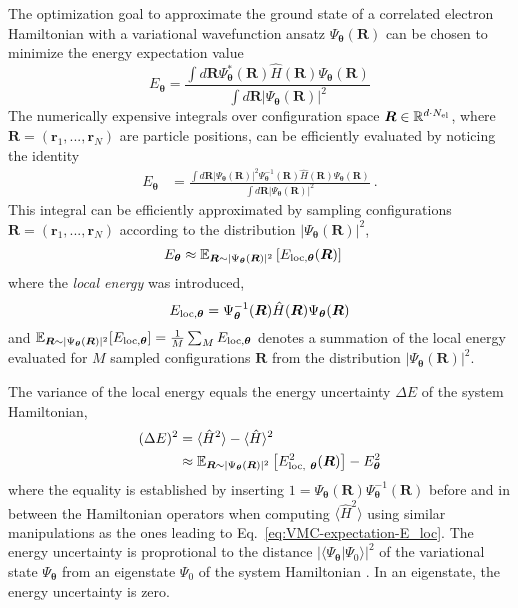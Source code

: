 \documentclass[
 reprint,
 amsmath,amssymb,
 aps, prx,
floatfix,longbibliography,
]{revtex4-2}
\begin{document}
The optimization goal to approximate the ground state of a correlated electron Hamiltonian with a variational wavefunction ansatz $\Psi_{\bm \theta}(\bm R)$ can be chosen to minimize the energy expectation value 
\begin{equation}
    E_{\bm \theta} = \frac{\int d\bm R \Psi_{\bm \theta}^*(\bm R) \hat{H} (\bm R)\Psi_{\bm \theta}(\bm R)}{\int d\bm R |\Psi_{\bm \theta}(\bm R)|^2} 
\end{equation}
The numerically expensive integrals over configuration space $\bm R \in \mathbb{R}^{d\cdot N_{\rm el}}$, where $\bm R = (\bm r_1, ..., \bm r_N)$ are particle positions, can be efficiently evaluated by noticing the identity
\begin{align}
    E_{\bm \theta} & = \frac{\int d\bm R |\Psi_{\bm \theta}(\bm R)|^2 \Psi_{\bm \theta}^{-1}(\bm R) \hat{H} (\bm R)\Psi_{\bm \theta}(\bm R)}{\int d\bm R |\Psi_{\bm \theta}(\bm R)|^2}\ . 
\end{align}
This integral can be efficiently approximated by sampling configurations $\bm R = (\bm r_1, ..., \bm r_N)$ according to the distribution $|\Psi_{\bm \theta}(\bm R)|^2$,
\begin{align}
    E_{\bm \theta} & \approx \mathbb{E}_{\bm R \sim |\Psi_{\bm \theta}(\bm R)|^2} \left[ E_{\rm loc, {\bm \theta}} (\bm R) \right] 
    \label{eq:VMC-expectation-E_loc}
\end{align}
where the \emph{local energy} 
was introduced,
\begin{equation}
    E_{\rm loc, {\bm \theta}} = \Psi_{\bm \theta}^{-1}(\bm R) \hat{H} (\bm R)\Psi_{\bm \theta}(\bm R)
\end{equation}
and 
$\mathbb{E}_{\bm R \sim |\Psi_{\bm \theta}(\bm R)|^2} [E_{\rm loc, {\bm \theta}}] = \frac{1}{M} \sum_M E_{\rm loc, {\bm \theta}}$ denotes a summation of the local energy evaluated for $M$ sampled configurations $\bm R$ from the distribution $|\Psi_{\bm \theta}(\bm R)|^2 $.

The variance of the local energy equals the energy uncertainty $\Delta E$ of the system Hamiltonian,
\begin{align}
    (\Delta E)^2 & = \langle \hat H^2\rangle - \langle \hat H \rangle^2 \nonumber \\ 
    & \approx \mathbb{E}_{\bm R \sim |\Psi_{\bm \theta} (\bm R)|^2} \left[ E_{\rm loc, \bm\ \bm \theta}^2 (\bm R)  \right] - E_{\bm \theta}^2
\end{align}
where the equality is established by inserting $1 = \Psi_{\bm \theta}(\bm R)\Psi_{\bm \theta}^{-1}(\bm R)$ before and in between the Hamiltonian operators when computing $\langle \hat H^2\rangle$ using similar manipulations as the ones leading to Eq.~\eqref{eq:VMC-expectation-E_loc}. The energy uncertainty is proprotional to the distance $|\langle \Psi_{\bm \theta}|\Psi_0 \rangle |^2$ of the variational state $\Psi_{\bm \theta}$ from an eigenstate $\Psi_0$ of the system Hamiltonian \cite{Anandan1990Oct}. In an eigenstate, the energy uncertainty is zero. 
\end{document}
